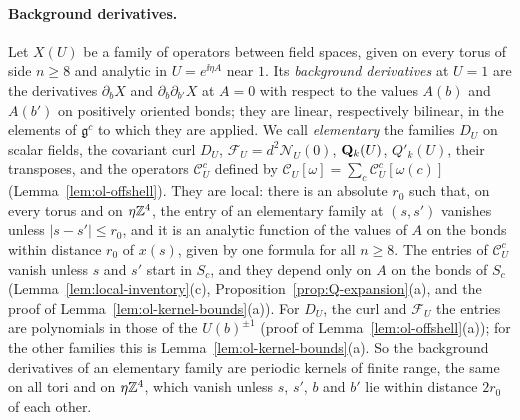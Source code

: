 \paragraph{Background derivatives.} Let $X(U)$ be a family of operators between field spaces, given on every torus of side $n\ge8$ and analytic in $U=e^{\ii\eta A}$ near $1$. Its \emph{background derivatives} at $U=1$ are the derivatives $\partial_bX$ and $\partial_b\partial_{b'}X$ at $A=0$ with respect to the values $A(b)$ and $A(b')$ on positively oriented bonds; they are linear, respectively bilinear, in the elements of $\mathfrak g^c$ to which they are applied. We call \emph{elementary} the families $D_U$ on scalar fields, the covariant curl $D_U$, $\mathcal F_U=d^2\mathcal N_U(0)$, $\mathbf Q_k(U)$, $Q'_k(U)$, their transposes, and the operators $\mathcal C^c_U$ defined by $\mathcal C_U[\omega]=\sum_c\mathcal C^c_U[\omega(c)]$ (Lemma~\ref{lem:ol-offshell}). They are local: there is an absolute $r_0$ such that, on every torus and on $\eta\mathbb Z^4$, the entry of an elementary family at $(s,s')$ vanishes unless $|s-s'|\le r_0$, and it is an analytic function of the values of $A$ on the bonds within distance $r_0$ of $x(s)$, given by one formula for all $n\ge8$. The entries of $\mathcal C^c_U$ vanish unless $s$ and $s'$ start in $S_c$, and they depend only on $A$ on the bonds of $S_c$ (Lemma~\ref{lem:local-inventory}(c), Proposition~\ref{prop:Q-expansion}(a), and the proof of Lemma~\ref{lem:ol-kernel-bounds}(a)). For $D_U$, the curl and $\mathcal F_U$ the entries are polynomials in those of the $U(b)^{\pm1}$ (proof of Lemma~\ref{lem:ol-offshell}(a)); for the other families this is Lemma~\ref{lem:ol-kernel-bounds}(a). So the background derivatives of an elementary family are periodic kernels of finite range, the same on all tori and on $\eta\mathbb Z^4$, which vanish unless $s$, $s'$, $b$ and $b'$ lie within distance $2r_0$ of each other.

